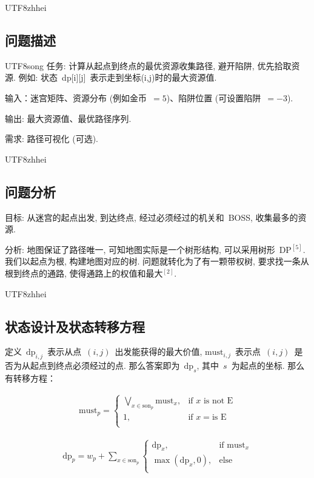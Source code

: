 \documentclass[10.5pt,compsoc]{CjC}
\theoremstyle{mystyle}
\begin{document}
\begin{CJK*}{UTF8}{zhhei}\subsection{问题描述}\end{CJK*}

\begin{CJK*}{UTF8}{song}
任务: 计算从起点到终点的最优资源收集路径, 避开陷阱, 优先拾取资源.
例如: 状态~dp[i][j]~表示走到坐标(i,j)时的最大资源值.

输入：迷宫矩阵、资源分布 (例如金币~$=5$)、陷阱位置 (可设置陷阱~$=-3$).

输出: 最大资源值、最优路径序列.

需求: 路径可视化 (可选).

\begin{CJK*}{UTF8}{zhhei}\subsection{问题分析}\end{CJK*}

目标: 从迷宫的起点出发, 到达终点, 经过必须经过的机关和~BOSS, 收集最多的资源.

分析: 地图保证了路径唯一, 可知地图实际是一个树形结构, 可以采用树形~DP$^{[5]}$.
我们以起点为根, 构建地图对应的树.
问题就转化为了有一颗带权树, 要求找一条从根到终点的通路, 使得通路上的权值和最大$^{[2]}$.


\begin{CJK*}{UTF8}{zhhei}\subsection{状态设计及状态转移方程}\end{CJK*}

定义~$\textrm{dp}_{i, j}$~表示从点~$(i,j)$~出发能获得的最大价值,
$\textrm{must}_{i,j}$~表示点~$(i,j)$~是否为从起点到终点必须经过的点.
那么答案即为~$\textrm{dp}_s$, 其中~$s$~为起点的坐标.
那么有转移方程：

\begin{align*}
\textrm{must}_p = 
\begin{cases}
\displaystyle \bigvee_{x\in{\text{son}}_p} \textrm{must}_x, & \text{if } x \text{ is not E} \\
1, & \text{if } x = \text{is E} \\
\end{cases}
\end{align*}

\begin{align*}
\textrm{dp}_p = w_p + \displaystyle \sum_{x\in{\text{son}}_p}
\begin{cases}
\textrm{dp}_x, & \text{if } \textrm{must}_x \\
\max(\textrm{dp}_x, 0), & \text{else} \\
\end{cases}
\end{align*}



\end{CJK*}
\end{document}
